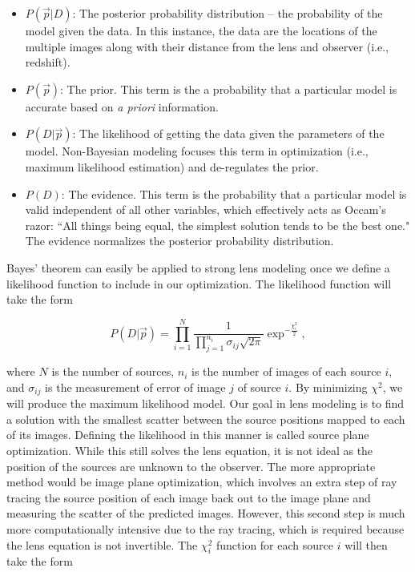 \begin{itemize}
\item $P(\vec{p} | D )$: The posterior probability distribution -- the probability of the model given the data. In this instance, the data are the locations of the multiple images along with their distance from the lens and observer (i.e., redshift).
\item $P(\vec{p})$: The prior. This term is the a probability that a particular model is accurate based on {\it a priori} information.
\item $P(D | \vec{p} )$:  The likelihood of getting the data given the parameters of the model. Non-Bayesian modeling focuses this term in optimization (i.e., maximum likelihood estimation) and de-regulates the prior.
\item $P(D)$: The evidence. This term is the probability that a particular model is valid independent of all other variables, which effectively acts as Occam's razor: ``All things being equal, the simplest solution tends to be the best one." The evidence normalizes the posterior probability distribution.
\end{itemize}

Bayes' theorem can easily be applied to strong lens modeling once we define a likelihood function to include in our optimization. The likelihood function will take the form

\begin{equation}
P(D | \vec{p} ) = \prod_{i=1}^N \frac{1}{  \prod_{j=1}^{n_i} \sigma_{ij} \sqrt{2\pi} } \exp^{-\frac{\chi_i^2}{2}},
\label{intro:eqn:likelihood}
\end{equation}

\noindent where $N$ is the number of sources, $n_i$ is the number of images of each source $i$, and $\sigma_{ij}$ is the measurement of error of image $j$ of source $i$. By minimizing $\chi^2$, we will produce the maximum likelihood model. Our goal in lens modeling is to find a solution with the smallest scatter between the source positions mapped to each of its images. Defining the likelihood in this manner is called source plane optimization. While this still solves the lens equation, it is not ideal as the position of the sources are unknown to the observer. The more appropriate method would be image plane optimization, which involves an extra step of ray tracing the source position of each image back out to the image plane and measuring the scatter of the predicted images. However, this second step is much more computationally intensive due to the ray tracing, which is required because the lens equation is not invertible. The $\chi_i^2$ function for each source $i$ will then take the form

